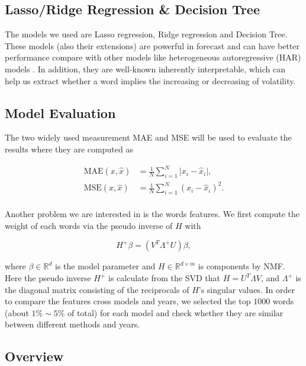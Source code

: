\documentclass[11pt]{article}
\begin{document}
\subsection{Lasso/Ridge Regression \& Decision Tree}

The models we used are Lasso regression, Ridge regression and Decision Tree. These models (also their extensions) are powerful in forecast and can have better performance compare with other models like heterogeneous autoregressive (HAR) models \cite{liang2023forecasting} \cite{li2022forecasting} \cite{christensen2023machine}. In addition, they are well-known inherently interpretable, which can help us extract whether a word implies the increasing or decreasing of volatility.

\subsection{Model Evaluation}

The two widely used measurement MAE and MSE will be used to evaluate the results where they are computed as

$$
  \begin{aligned}
    \text{MAE}(x, \hat{x}) & = \frac{1}{N} \sum_{i=1}^N \vert x_i - \hat{x}_i \vert, \\
    \text{MSE}(x, \hat{x}) & = \frac{1}{N} \sum_{i=1}^N  (x_i - \hat{x}_i)^2.        \\
  \end{aligned}
$$

Another problem we are interested in is the words features. We first compute the weight of each words via the pseudo inverse of $H$ with

$$
  H^+ \beta = (V^T \Lambda^+ U) \beta,
$$

where $\beta \in \mathbb{R}^d$ is the model parameter and $H \in \mathbb{R}^{d \times m}$ is components by NMF. Here the pseudo inverse $H^+$ is calculate from the SVD that $H = U^T \Lambda V$, and $\Lambda^+$ is the diagonal matrix consisting of the reciprocals of $H$'s singular values. In order to compare the features cross models and years, we selected the top $1000$ words (about $1\% \sim 5\%$ of total) for each model and check whether they are similar between different methods and years.

\subsection{Overview}
\end{document}
